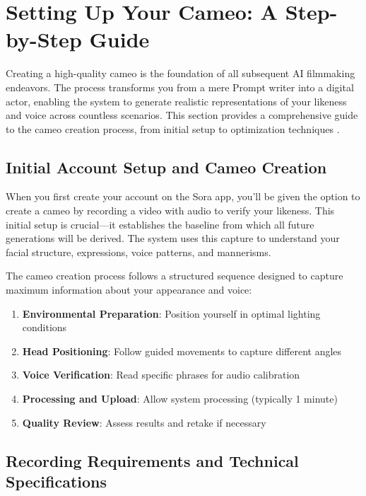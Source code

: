 \section{Setting Up Your Cameo: A Step-by-Step Guide}
\label{sec:cameo-setup-guide}

Creating a high-quality cameo is the foundation of all subsequent AI filmmaking endeavors. The process transforms you from a mere Prompt writer into a digital actor, enabling the system to generate realistic representations of your likeness and voice across countless scenarios. This section provides a comprehensive guide to the cameo creation process, from initial setup to optimization techniques \citep{openai2024cameos}.

\subsection{Initial Account Setup and Cameo Creation}

When you first create your account on the Sora app, you'll be given the option to create a cameo by recording a video with audio to verify your likeness. This initial setup is crucial—it establishes the baseline from which all future generations will be derived. The system uses this capture to understand your facial structure, expressions, voice patterns, and mannerisms.

The cameo creation process follows a structured sequence designed to capture maximum information about your appearance and voice:

\begin{enumerate}
\item \textbf{Environmental Preparation}: Position yourself in optimal lighting conditions
\item \textbf{Head Positioning}: Follow guided movements to capture different angles
\item \textbf{Voice Verification}: Read specific phrases for audio calibration
\item \textbf{Processing and Upload}: Allow system processing (typically 1 minute)
\item \textbf{Quality Review}: Assess results and retake if necessary
\end{enumerate}

\subsection{Recording Requirements and Technical Specifications}

